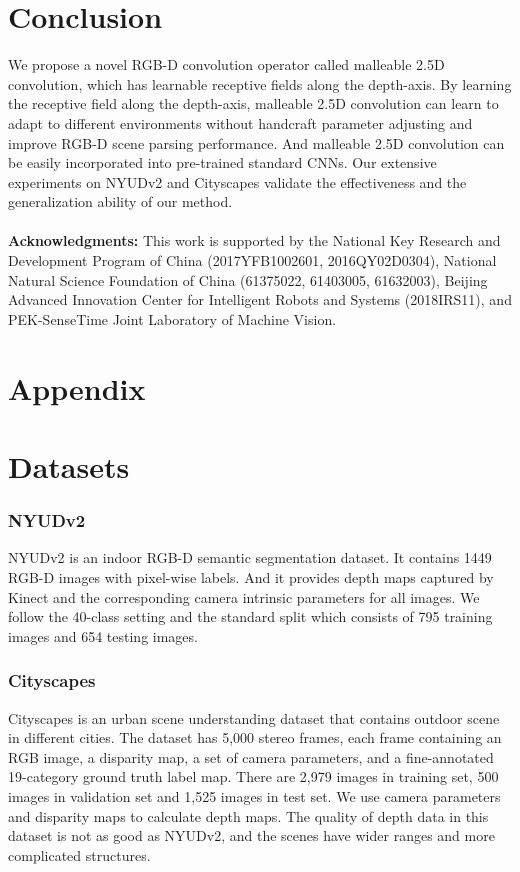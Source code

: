 \documentclass[runningheads]{llncs}
\begin{document}
\section{Conclusion}
We propose a novel RGB-D convolution operator called malleable 2.5D convolution, which has learnable receptive fields along the depth-axis.
By learning the receptive field along the depth-axis, malleable 2.5D convolution can learn to adapt to different environments without handcraft parameter adjusting and improve RGB-D scene parsing performance.
And malleable 2.5D convolution can be easily incorporated into pre-trained standard CNNs.
Our extensive experiments on NYUDv2 and Cityscapes validate the effectiveness and the generalization ability of our method.
\\
\\
\noindent \textbf{Acknowledgments:} This work is supported by the National Key Research and Development Program of China (2017YFB1002601, 2016QY02D0304), National Natural Science Foundation of China (61375022, 61403005, 61632003), Beijing Advanced Innovation Center for Intelligent Robots and Systems (2018IRS11), and PEK-SenseTime Joint Laboratory of Machine Vision.




\clearpage
\section*{Appendix}
\setcounter{section}{0}

\section{Datasets}
\subsubsection{NYUDv2}
NYUDv2\cite{NYUDv2} is an indoor RGB-D semantic segmentation dataset.
It contains 1449 RGB-D images with pixel-wise labels.
And it provides depth maps captured by Kinect and the corresponding camera intrinsic parameters for all images.
We follow the 40-class setting and the standard split which consists of 795 training images and 654 testing images.
\subsubsection{Cityscapes}
Cityscapes\cite{Cityscapes} is an urban scene understanding dataset that contains outdoor scene in different cities.
The dataset has 5,000 stereo frames,
each frame containing an  RGB image, a disparity map, a set of camera parameters, and a fine-annotated 19-category ground truth label map.
There are 2,979 images in training set, 500 images in validation set and 1,525 images in test set.
We use camera parameters and disparity maps to calculate depth maps.
The quality of depth data in this dataset is not as good as NYUDv2, and the scenes have wider ranges and more complicated structures.
\end{document}
